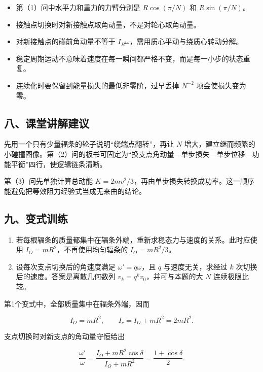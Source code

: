 \documentclass[12pt,a4paper,UTF8]{ctexart}
\newcommand{\tightlist}{\setlength{\itemsep}{0pt}\setlength{\parskip}{0pt}}
\begin{document}
\begin{itemize}
\tightlist
\item
  第（1）问中水平力和重力的力臂分别是 \(R\cos(\pi/N)\) 和
  \(R\sin(\pi/N)\)。
\item
  接触点切换时对新接触点取角动量，不是对轮心取角动量。
\item
  对新接触点的碰前角动量不等于
  \(I_B\omega\)，需用质心平动与绕质心转动分解。
\item
  稳定周期运动不意味着速度在每一瞬间都严格不变，而是每一小步的状态重复。
\item
  连续化时要保留到能量损失的最低非零阶，过早丢掉 \(N^{-2}\)
  项会使损失变为零。
\end{itemize}

\subsection{八、课堂讲解建议}\label{ux516bux8bfeux5802ux8bb2ux89e3ux5efaux8bae-1}

先用一个只有少量辐条的轮子说明``绕端点翻转''，再让 \(N\)
增大，建立继而频繁的小碰撞图像。第（2）问的板书可固定为``换支点角动量---单步损失---单步位移---功能平衡''四行，使逻辑链条清晰。

第（3）问先单独计算总动能
\(K=2mv^2/3\)，再由单步损失转换成功率。这一顺序能避免把等效阻力经验式当成无来由的结论。

\subsection{九、变式训练}\label{ux4e5dux53d8ux5f0fux8badux7ec3-1}

\begin{enumerate}
\def\labelenumi{\arabic{enumi}.}
\tightlist
\item
  若每根辐条的质量都集中在辐条外端，重新求稳态力与速度的关系。此时应使用
  \(I_O=mR^2\)，不再使用均匀辐条的 \(I_O=mR^2/3\)。
\item
  设每次支点切换后的角速度满足 \(\omega'=q\omega\)，且 \(q\)
  与速度无关，求经过 \(k\) 次切换后的速度。答案是离散几何数列
  \(v_k=q^k v_0\)，并可与本题的大 \(N\) 连续极限比较。
\end{enumerate}

第1个变式中，全部质量集中在辐条外端，因而

\[I_O=mR^2,\qquad I_c=I_O+mR^2=2mR^2.\]

支点切换时对新支点的角动量守恒给出

\[\frac{\omega'}{\omega}
=\frac{I_O+mR^2\cos\delta}{I_O+mR^2}
=\frac{1+\cos\delta}{2}.\]
\end{document}
